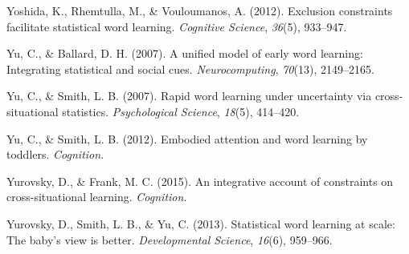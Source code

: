 \documentclass[authoryear, review]{elsarticle}
\begin{document}
\hypertarget{ref-yoshida2012exclusion}{}
Yoshida, K., Rhemtulla, M., \& Vouloumanos, A. (2012). Exclusion
constraints facilitate statistical word learning. \emph{Cognitive
Science}, \emph{36}(5), 933--947.

\hypertarget{ref-yu2007unified}{}
Yu, C., \& Ballard, D. H. (2007). A unified model of early word
learning: Integrating statistical and social cues.
\emph{Neurocomputing}, \emph{70}(13), 2149--2165.

\hypertarget{ref-yu2007rapid}{}
Yu, C., \& Smith, L. B. (2007). Rapid word learning under uncertainty
via cross-situational statistics. \emph{Psychological Science},
\emph{18}(5), 414--420.

\hypertarget{ref-yu2012embodied}{}
Yu, C., \& Smith, L. B. (2012). Embodied attention and word learning by
toddlers. \emph{Cognition}.

\hypertarget{ref-yurovsky2014algorithmic}{}
Yurovsky, D., \& Frank, M. C. (2015). An integrative account of
constraints on cross-situational learning. \emph{Cognition}.

\hypertarget{ref-yurovsky2013statistical}{}
Yurovsky, D., Smith, L. B., \& Yu, C. (2013). Statistical word learning
at scale: The baby's view is better. \emph{Developmental Science},
\emph{16}(6), 959--966.


\end{document}
